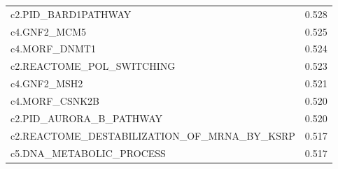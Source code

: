 \begin{table}[!htbp]
\begin{tabular}{@{}ll@{}}
c2.PID\_BARD1PATHWAY                                                                                                                                                                                                                    & 0.528          \\
c4.GNF2\_MCM5                                                                                                                                                                                                                           & 0.525          \\
c4.MORF\_DNMT1                                                                                                                                                                                                                          & 0.524          \\
c2.REACTOME\_POL\_SWITCHING                                                                                                                                                                                                             & 0.523          \\
c4.GNF2\_MSH2                                                                                                                                                                                                                           & 0.521          \\
c4.MORF\_CSNK2B                                                                                                                                                                                                                         & 0.520          \\
c2.PID\_AURORA\_B\_PATHWAY                                                                                                                                                                                                              & 0.520          \\
c2.REACTOME\_DESTABILIZATION\_OF\_MRNA\_BY\_KSRP                                                                                                                                                                                        & 0.517          \\
c5.DNA\_METABOLIC\_PROCESS                                                                                                                                                                                                              & 0.517          \\

\end{tabular}
\end{table}
